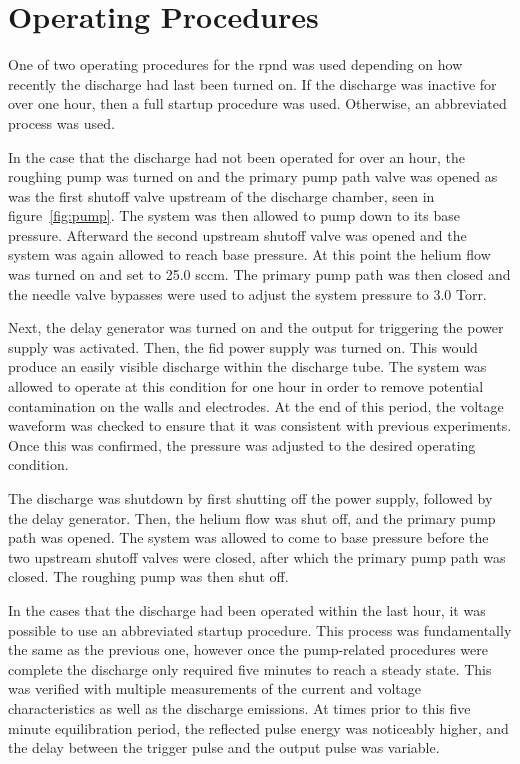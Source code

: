 \section{Operating Procedures}

One of two operating procedures for the \acs{rpnd} was used depending on how
recently the discharge had last been turned on. If the discharge was inactive
for over one hour, then a full startup procedure was used. Otherwise, an abbreviated
process was used.

In the case that the discharge had not been operated for over an hour, the
roughing pump was turned on and the primary pump path valve was opened as was
the first shutoff valve upstream of the discharge chamber, seen in
figure~\ref{fig:pump}. The system was then allowed to pump down to its base
pressure. Afterward the second upstream shutoff valve was opened and the system
was again allowed to reach base pressure. At this point the helium flow was
turned on and set to 25.0 sccm. The primary pump path was then closed and the
needle valve bypasses were used to adjust the system pressure to 3.0 Torr.

Next, the delay generator was turned on and the output for triggering the power
supply was activated. Then, the \acs{fid} power supply was turned on. This would
produce an easily visible discharge within the discharge tube. The system was
allowed to operate at this condition for one hour in order to remove potential
contamination on the walls and electrodes. At the end of this period, the
voltage waveform was checked to ensure that it was consistent with previous
experiments. Once this was confirmed, the pressure was adjusted to the desired
operating condition.

The discharge was shutdown by first shutting off the power supply, followed by
the delay generator. Then, the helium flow was shut off, and the primary pump
path was opened. The system was allowed to come to base pressure before the two
upstream shutoff valves were closed, after which the primary pump path was
closed. The roughing pump was then shut off.

In the cases that the discharge had been operated within the last hour, it was
possible to use an abbreviated startup procedure. This process was fundamentally
the same as the previous one, however once the pump-related procedures were
complete the discharge only required five minutes to reach a steady state. This
was verified with multiple measurements of the current and voltage
characteristics as well as the discharge emissions. At times prior to this five
minute equilibration period, the reflected pulse energy was noticeably higher,
and the delay between the trigger pulse and the output pulse was variable.

